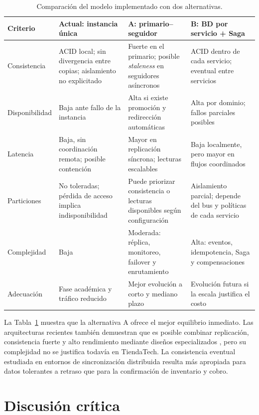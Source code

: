 \documentclass[11pt,a4paper]{article}
\begin{document}
\begin{table}[htbp]
\centering
\caption{Comparación del modelo implementado con dos alternativas.}
\label{tab:comparacion}
\small
\begin{tabularx}{\textwidth}{>{\raggedright\arraybackslash}p{2.5cm}XXX}
\toprule
\textbf{Criterio} & \textbf{Actual: instancia única} & \textbf{A: primario--seguidor} & \textbf{B: BD por servicio + Saga} \\
\midrule
Consistencia & ACID local; sin divergencia entre copias; aislamiento no explicitado & Fuerte en el primario; posible \emph{staleness} en seguidores asíncronos & ACID dentro de cada servicio; eventual entre servicios \\
Disponibilidad & Baja ante fallo de la instancia & Alta si existe promoción y redirección automáticas & Alta por dominio; fallos parciales posibles \\
Latencia & Baja, sin coordinación remota; posible contención & Mayor en replicación síncrona; lecturas escalables & Baja localmente, pero mayor en flujos coordinados \\
Particiones & No toleradas; pérdida de acceso implica indisponibilidad & Puede priorizar consistencia o lecturas disponibles según configuración & Aislamiento parcial; depende del bus y políticas de cada servicio \\
Complejidad & Baja & Moderada: réplica, monitoreo, failover y enrutamiento & Alta: eventos, idempotencia, Saga y compensaciones \\
Adecuación & Fase académica y tráfico reducido & Mejor evolución a corto y mediano plazo & Evolución futura si la escala justifica el costo \\
\bottomrule
\end{tabularx}
\end{table}

La Tabla~\ref{tab:comparacion} muestra que la alternativa A ofrece el mejor equilibrio inmediato. Las arquitecturas recientes también demuestran que es posible combinar replicación, consistencia fuerte y alto rendimiento mediante diseños especializados \cite{krechowicz2025layered}, pero su complejidad no se justifica todavía en TiendaTech. La consistencia eventual estudiada en entornos de sincronización distribuida \cite{zhao2025acc} resulta más apropiada para datos tolerantes a retraso que para la confirmación de inventario y cobro.

\section{Discusión crítica}
\end{document}
